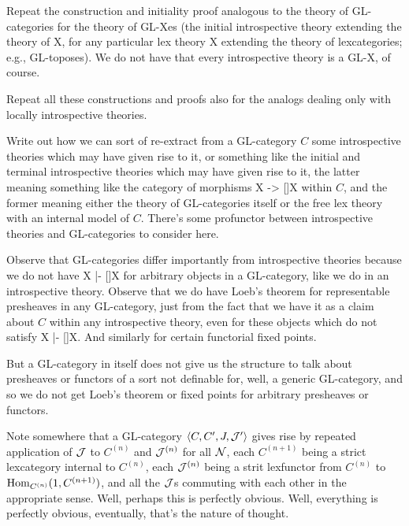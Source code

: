 \begin{TODOblock}
Repeat the construction and initiality proof analogous to the theory of GL-categories for the theory of GL-Xes (the initial introspective theory extending the theory of X, for any particular lex theory X extending the theory of lexcategories; e.g., GL-toposes). We do not have that every introspective theory is a GL-X, of course.

Repeat all these constructions and proofs also for the analogs dealing only with locally introspective theories.
\end{TODOblock}

\begin{TODOblock}
Write out how we can sort of re-extract from a GL-category $C$ some introspective theories which may have given rise to it, or something like the initial and terminal introspective theories which may have given rise to it, the latter meaning something like the category of morphisms X -> []X within $C$, and the former meaning either the theory of GL-categories itself or the free lex theory with an internal model of $C$. There's some profunctor between introspective theories and GL-categories to consider here.
\end{TODOblock}

\begin{TODOblock}
Observe that GL-categories differ importantly from introspective theories because we do not have X |- []X for arbitrary objects in a GL-category, like we do in an introspective theory. Observe that we do have Loeb's theorem for representable presheaves in any GL-category, just from the fact that we have it as a claim about $C$ within any introspective theory, even for these objects which do not satisfy X |- []X. And similarly for certain functorial fixed points.

But a GL-category in itself does not give us the structure to talk about presheaves or functors of a sort not definable for, well, a generic GL-category, and so we do not get Loeb's theorem or fixed points for arbitrary presheaves or functors.
\end{TODOblock}

\begin{TODOblock}
Note somewhere that a GL-category $\langle C, C', J, \mathcal{J}' \rangle$ gives rise by repeated application of $\mathcal{J}$ to $C^{(n)}$ and $\mathcal{J}^{(n)}$ for all $\mathcal{N}$, each $C^{(n + 1)}$ being a strict lexcategory internal to $C^{(n)}$, each $\mathcal{J}^{(n)}$ being a strit lexfunctor from $C^{(n)}$ to $\operatorname{Hom}_{C^{(n)}}(1, C^{(n + 1)})$, and all the $\mathcal{J}$s commuting with each other in the appropriate sense. Well, perhaps this is perfectly obvious. Well, everything is perfectly obvious, eventually, that's the nature of thought.
\end{TODOblock}


